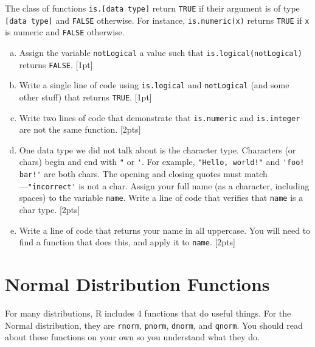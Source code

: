\documentclass[12pt]{article}
\begin{document}
	The class of functions \verb|is.[data type]| return \verb|TRUE| if their argument is of type \verb|[data type]| and \verb|FALSE| otherwise. For instance, \verb|is.numeric(x)| returns \verb|TRUE| if \verb|x| is numeric and \verb|FALSE| otherwise.
	
	\begin{enumerate}[(a)]
		\item Assign the variable \verb|notLogical| a value such that \verb|is.logical(notLogical)| returns \verb|FALSE|. [1pt]
		\item Write a single line of code using \verb|is.logical| and \verb|notLogical| (and some other stuff) that returns \verb|TRUE|. [1pt]
		\item Write two lines of code that demonstrate that \verb|is.numeric| and \verb|is.integer| are not the same function. [2pts]
		\item One data type we did not talk about is the character type. Characters (or chars) begin and end with \verb|"| or \verb|'|. For example, \verb|"Hello, world!"| and \verb|'foo! bar!'| are both chars. The opening and closing quotes must match---\verb|"incorrect'| is not a char. Assign your full name (as a character, including spaces) to the variable \verb|name|. Write a line of code that verifies that \verb|name| is a char type. [2pts]
		\item Write a line of code that returns your name in all uppercase. You will need to find a function that does this, and apply it to \verb|name|. [2pts]
	\end{enumerate}
	
	\section{Normal Distribution Functions}
	
	For many distributions, R includes 4 functions that do useful things. For the Normal distribution, they are \verb|rnorm|, \verb|pnorm|, \verb|dnorm|, and \verb|qnorm|. You should read about these functions on your own so you understand what they do.
	
\end{document}
